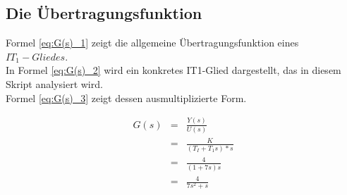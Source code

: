 \subsection{Die Übertragungsfunktion}

Formel \ref{eq:G(s)_1} zeigt die allgemeine Übertragungsfunktion eines $IT_1-Gliedes$.\\ In Formel \ref{eq:G(s)_2} wird ein konkretes IT1-Glied dargestellt, das in diesem Skript analysiert wird. \\ Formel \ref{eq:G(s)_3} zeigt dessen ausmultiplizierte Form.

\begin{eqnarray}
G(s) &=& \frac{Y(s)}{U(s)} \\
\label{eq:G(s)_1}
&=& \frac{K}{(T_I+T_1s)*s} \\
\label{eq:G(s)_2}
&=& \frac{4}{(1+7s)s} \\
\label{eq:G(s)_3}
&=& \frac{4}{7s^2+s}
\end{eqnarray}